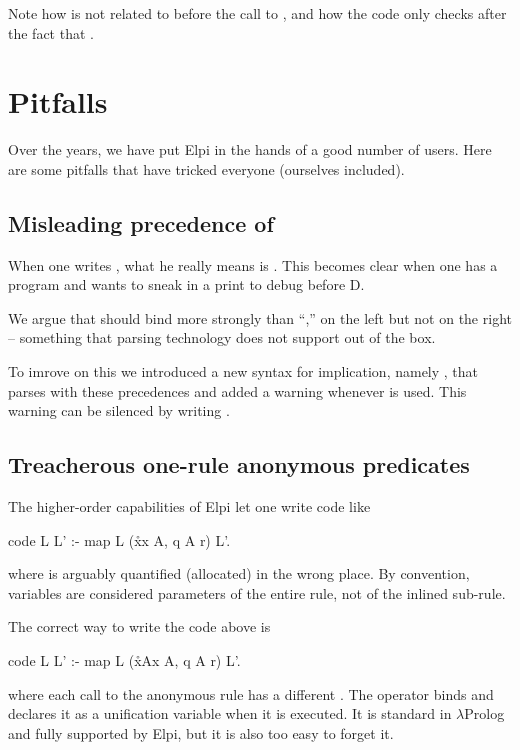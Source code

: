 \documentclass[a4paper, 11pt]{book}
\begin{document}
\noindent
Note how  is not related to  before the call to
, and how the code only checks after the fact that
.

\section{Pitfalls}


Over the years, we have put Elpi in the hands of a good number of users. Here
are some pitfalls that have tricked everyone (ourselves included).

\subsection{Misleading precedence of \elpi{=>}}

When one writes , what he really means is .
This
becomes clear when one has a program  and wants to sneak in a
print to debug before D.

We argue that \elpi{=>} should bind more strongly than ``,'' on the left but
not on the right -- something that parsing technology does not support out of the
box. 

To imrove on this we introduced a new syntax for implication, namely \elpi{==>},
that parses with these precedences and added a
warning whenever  is used. This warning can be silenced by
writing .

\subsection{Treacherous one-rule anonymous predicates}

The higher-order capabilities of Elpi let one write code like
\begin{elpicode}
code L L' :- map L (x\r\p x A, q A r) L'.
\end{elpicode}
where  is arguably quantified (allocated) in the wrong place. By
convention, variables are considered parameters of the entire rule, not of the
inlined sub-rule.

The correct way to write the code above is
\begin{elpicode}
code L L' :- map L (x\r\sigma A\p x A, q A r) L'.
\end{elpicode}
where each call to the anonymous rule has a different .
The  operator binds  and declares it as
a unification variable when it is executed. It is standard in
$\lambda$Prolog and fully supported by Elpi, but it is also
too easy to forget it.
\end{document}
